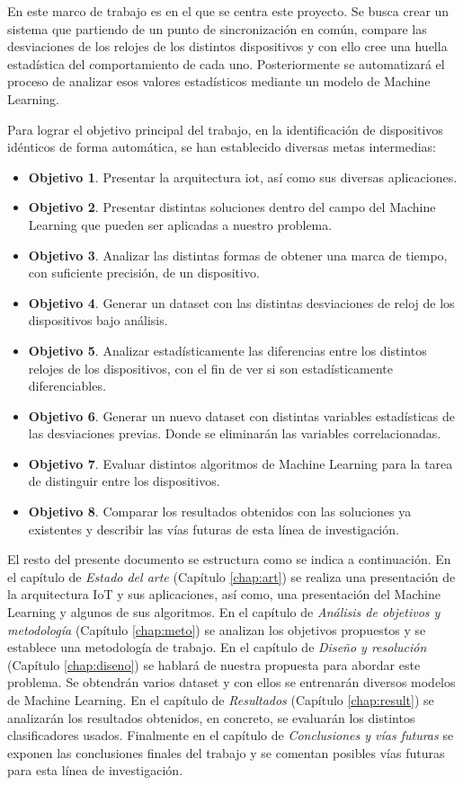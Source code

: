 En este marco de trabajo es en el que se centra este proyecto. Se busca crear un sistema que partiendo de un punto de sincronización en común, compare las desviaciones de los relojes de los distintos dispositivos y con ello cree una huella estadística del comportamiento de cada uno. Posteriormente se automatizará el proceso de analizar esos valores estadísticos mediante un modelo de Machine Learning.

Para lograr el objetivo principal del trabajo, en la identificación de dispositivos idénticos de forma automática, se han establecido diversas metas intermedias:

\begin{itemize}
    \item \textbf{Objetivo 1}. Presentar la arquitectura \acrshort{iot}, así como sus diversas aplicaciones.
    \item \textbf{Objetivo 2}. Presentar distintas soluciones dentro del campo del Machine Learning que pueden ser aplicadas a nuestro problema.
    \item \textbf{Objetivo 3}. Analizar las distintas formas de obtener una marca de tiempo, con suficiente precisión, de un dispositivo.
    \item \textbf{Objetivo 4}. Generar un dataset con las distintas desviaciones de reloj de los dispositivos bajo análisis.
    \item \textbf{Objetivo 5}. Analizar estadísticamente las diferencias entre los distintos relojes de los dispositivos, con el fin de ver si son estadísticamente diferenciables.
    \item \textbf{Objetivo 6}. Generar un nuevo dataset con distintas variables estadísticas de las desviaciones previas. Donde se eliminarán las variables correlacionadas.
    \item \textbf{Objetivo 7}. Evaluar distintos algoritmos de Machine Learning para la tarea de distinguir entre los dispositivos.
    \item \textbf{Objetivo 8}. Comparar los resultados obtenidos con las soluciones ya existentes y describir las vías futuras de esta línea de investigación.
\end{itemize}

El resto del presente documento se estructura como se indica a continuación. En el capítulo de \textit{Estado del arte} (Capítulo \ref{chap:art}) se realiza una presentación de la arquitectura IoT y sus aplicaciones, así como, una presentación del Machine Learning y algunos de sus algoritmos. En el capítulo de \textit{Análisis de objetivos y metodología} (Capítulo \ref{chap:meto}) se analizan los objetivos propuestos y se establece una metodología de trabajo. En el capítulo de \textit{Diseño y resolución} (Capítulo \ref{chap:diseno}) se hablará de nuestra propuesta para abordar este problema. Se obtendrán varios dataset y con ellos se entrenarán diversos modelos de Machine Learning. En el capítulo de \textit{Resultados} (Capítulo \ref{chap:result}) se analizarán los resultados obtenidos, en concreto, se evaluarán los distintos clasificadores usados. Finalmente en el capítulo de \textit{Conclusiones y vías futuras} se exponen las conclusiones finales del trabajo y se comentan posibles vías futuras para esta línea de investigación.

